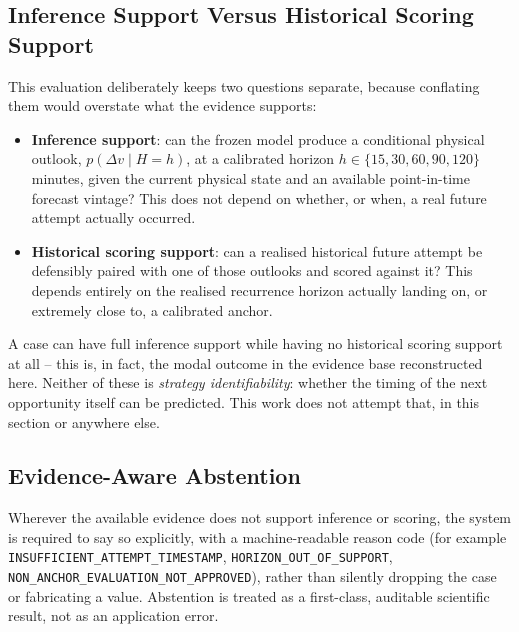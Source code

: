 \subsection{Inference Support Versus Historical Scoring Support}
\label{sec:pit-two-questions}
This evaluation deliberately keeps two questions separate, because conflating them would overstate what the
evidence supports:
\begin{itemize}
\item \textbf{Inference support}: can the frozen model produce a conditional physical outlook,
$p(\Delta v \mid H=h)$, at a calibrated horizon $h \in \{15,30,60,90,120\}$ minutes, given the current physical
state and an available point-in-time forecast vintage? This does not depend on whether, or when, a real
future attempt actually occurred.
\item \textbf{Historical scoring support}: can a realised historical future attempt be defensibly paired with
one of those outlooks and scored against it? This depends entirely on the realised recurrence horizon
actually landing on, or extremely close to, a calibrated anchor.
\end{itemize}
A case can have full inference support while having no historical scoring support at all -- this is, in fact,
the modal outcome in the evidence base reconstructed here. Neither of these is \emph{strategy identifiability}:
whether the timing of the next opportunity itself can be predicted. This work does not attempt that, in this
section or anywhere else.

\subsection{Evidence-Aware Abstention}
Wherever the available evidence does not support inference or scoring, the system is required to say so
explicitly, with a machine-readable reason code (for example \texttt{INSUFFICIENT\_ATTEMPT\_TIMESTAMP},
\texttt{HORIZON\_OUT\_OF\_SUPPORT}, \texttt{NON\_ANCHOR\_EVALUATION\_NOT\_APPROVED}), rather than silently
dropping the case or fabricating a value. Abstention is treated as a first-class, auditable scientific result,
not as an application error.

